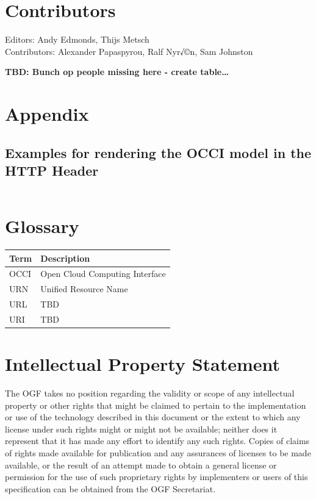 \documentclass[10pt,a4paper]{article}
\begin{document}
\section{Contributors}

Editors: Andy Edmonds, Thijs Metsch \\
Contributors: Alexander Papaspyrou, Ralf Nyr√©n, Sam Johnston

\textbf{TBD: Bunch op people missing here - create table\ldots}

\section{Appendix}

\subsection{Examples for rendering the OCCI model in the HTTP Header}

\begin{verbatim}

\end{verbatim}

\section{Glossary}

\begin{tabular}{l|l}
Term & Description \\
\hline
OCCI & Open Cloud Computing Interface \\
URN & Unified Resource Name \\
URL & TBD \\
URI & TBD \\
\end{tabular}

\section{Intellectual Property Statement}

The OGF takes no position regarding the validity or scope of any intellectual property or other rights that might be claimed to pertain to the implementation or use of the technology described in this document or the extent to which any license under such rights might or might not be available; neither does it represent that it has made any effort to identify any such rights. Copies of claims of rights made available for publication and any assurances of licenses to be made available, or the result of an attempt made to obtain a general license or permission for the use of such proprietary rights by implementers or users of this specification can be obtained from the OGF Secretariat.
\end{document}

